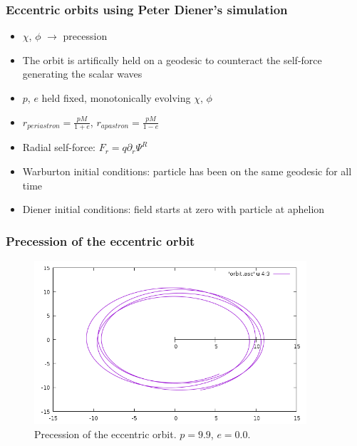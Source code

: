 \documentclass{beamer}
\begin{document}
\begin{frame}
  \frametitle{Eccentric orbits using Peter Diener's simulation}
  \begin{itemize}
  \item $\chi$, $\phi$ $\rightarrow$ precession
  \item The orbit is artifically held on a geodesic to counteract the self-force generating the scalar waves
  \item $p$, $e$ held fixed, monotonically evolving $\chi$, $\phi$
  \item $r_{periastron}=\frac{pM}{1+e}$, $r_{apastron}=\frac{pM}{1-e}$
  \item Radial self-force: $F_r=q\partial_r\Psi^R$
  \item Warburton initial conditions: particle has been on the same geodesic for all time
  \item Diener initial conditions: field starts at zero with particle at aphelion
  \end{itemize}
\end{frame}

\begin{frame}
  \frametitle{Precession of the eccentric orbit}
  \begin{figure}
    \includegraphics[width=0.9\textwidth]{orbitevolvedg44p99e01}
    \caption{Precession of the eccentric orbit. $p=9.9$, $e=0.0$.}
  \end{figure}
\end{frame}
\end{document}
